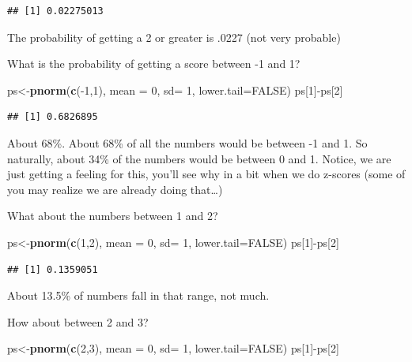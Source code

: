 \documentclass[]{book}
\newenvironment{Shaded}{\begin{snugshade}}{\end{snugshade}}
\newcommand{\KeywordTok}[1]{\textcolor[rgb]{0.13,0.29,0.53}{\textbf{{#1}}}}
\newcommand{\DataTypeTok}[1]{\textcolor[rgb]{0.13,0.29,0.53}{{#1}}}
\newcommand{\DecValTok}[1]{\textcolor[rgb]{0.00,0.00,0.81}{{#1}}}
\newcommand{\OtherTok}[1]{\textcolor[rgb]{0.56,0.35,0.01}{{#1}}}
\newcommand{\NormalTok}[1]{{#1}}
\theoremstyle{definition}
\theoremstyle{definition}
\theoremstyle{definition}
\theoremstyle{remark}
\begin{document}
\begin{verbatim}
## [1] 0.02275013
\end{verbatim}

The probability of getting a 2 or greater is .0227 (not very probable)

What is the probability of getting a score between -1 and 1?

\begin{Shaded}
\begin{Highlighting}[]
\NormalTok{ps<-}\KeywordTok{pnorm}\NormalTok{(}\KeywordTok{c}\NormalTok{(-}\DecValTok{1}\NormalTok{,}\DecValTok{1}\NormalTok{), }\DataTypeTok{mean =} \DecValTok{0}\NormalTok{, }\DataTypeTok{sd=} \DecValTok{1}\NormalTok{, }\DataTypeTok{lower.tail=}\OtherTok{FALSE}\NormalTok{)}
\NormalTok{ps[}\DecValTok{1}\NormalTok{]-ps[}\DecValTok{2}\NormalTok{]}
\end{Highlighting}
\end{Shaded}

\begin{verbatim}
## [1] 0.6826895
\end{verbatim}

About 68\%. About 68\% of all the numbers would be between -1 and 1. So
naturally, about 34\% of the numbers would be between 0 and 1. Notice,
we are just getting a feeling for this, you'll see why in a bit when we
do z-scores (some of you may realize we are already doing that\ldots{})

What about the numbers between 1 and 2?

\begin{Shaded}
\begin{Highlighting}[]
\NormalTok{ps<-}\KeywordTok{pnorm}\NormalTok{(}\KeywordTok{c}\NormalTok{(}\DecValTok{1}\NormalTok{,}\DecValTok{2}\NormalTok{), }\DataTypeTok{mean =} \DecValTok{0}\NormalTok{, }\DataTypeTok{sd=} \DecValTok{1}\NormalTok{, }\DataTypeTok{lower.tail=}\OtherTok{FALSE}\NormalTok{)}
\NormalTok{ps[}\DecValTok{1}\NormalTok{]-ps[}\DecValTok{2}\NormalTok{]}
\end{Highlighting}
\end{Shaded}

\begin{verbatim}
## [1] 0.1359051
\end{verbatim}

About 13.5\% of numbers fall in that range, not much.

How about between 2 and 3?

\begin{Shaded}
\begin{Highlighting}[]
\NormalTok{ps<-}\KeywordTok{pnorm}\NormalTok{(}\KeywordTok{c}\NormalTok{(}\DecValTok{2}\NormalTok{,}\DecValTok{3}\NormalTok{), }\DataTypeTok{mean =} \DecValTok{0}\NormalTok{, }\DataTypeTok{sd=} \DecValTok{1}\NormalTok{, }\DataTypeTok{lower.tail=}\OtherTok{FALSE}\NormalTok{)}
\NormalTok{ps[}\DecValTok{1}\NormalTok{]-ps[}\DecValTok{2}\NormalTok{]}
\end{Highlighting}
\end{Shaded}
\end{document}
